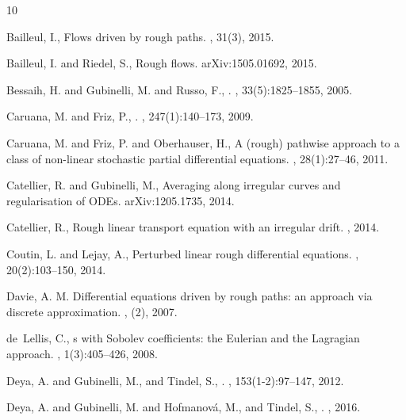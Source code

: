 \documentclass[11pt,a4paper]{amsart}
\theoremstyle{plain}%
\theoremstyle{definition}
\theoremstyle{remark}
\numberwithin{equation}{section} %
\begin{document}
\begin{thebibliography}{10}

Bailleul, I.,
\newblock Flows driven by rough paths.
, 31(3), 2015.


Bailleul, I. and Riedel, S.,
\newblock Rough flows.
\newblock arXiv:1505.01692, 2015. 

Bessaih, H. and  Gubinelli, M. and Russo, F.,
.
, 33(5):1825--1855, 2005.

 Caruana, M. and Friz, P.,
.
, 247(1):140--173, 2009.

Caruana, M. and Friz, P. and Oberhauser, H.,
\newblock A (rough) pathwise approach to a class of non-linear stochastic partial differential equations.
, 28(1):27--46, 2011.

Catellier, R. and Gubinelli, M.,
\newblock Averaging along irregular curves and regularisation of ODEs.
\newblock arXiv:1205.1735, 2014.

Catellier, R.,
\newblock Rough linear transport equation with an irregular drift.
, 2014.

Coutin, L. and Lejay, A.,
\newblock Perturbed linear rough differential equations.
, 20(2):103--150, 2014.

Davie, A. M.
\newblock Differential equations driven by rough paths: an approach via discrete approximation.
, (2), 2007.

de~Lellis, C.,
s with {S}obolev coefficients: the {E}ulerian and the {L}agragian approach.
, 1(3):405--426, 2008.

Deya, A. and Gubinelli, M., and  Tindel, S.,
.
, 153(1-2):97--147, 2012.


Deya, A. and Gubinelli, M. and Hofmanov\'a, M., and Tindel, S.,
.
, 2016.



\end{thebibliography}
\end{document}
